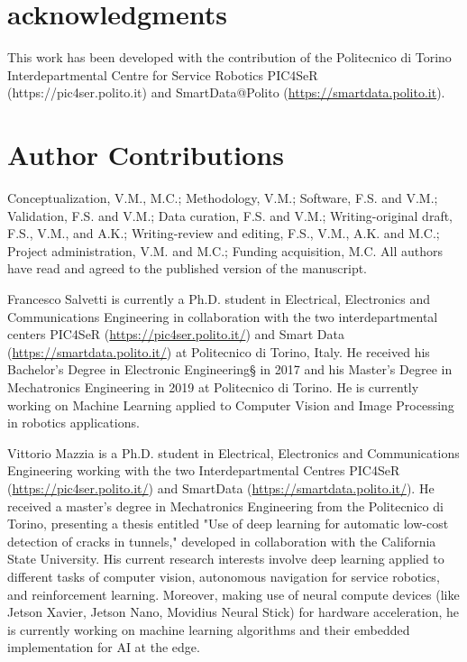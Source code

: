 \documentclass[journal]{IEEEtran}
\begin{document}
\section*{acknowledgments}
This work has been developed with the contribution of the Politecnico di Torino Interdepartmental Centre for Service Robotics PIC4SeR (https://pic4ser.polito.it) and SmartData@Polito (\url{https://smartdata.polito.it}).

\section*{Author Contributions}
Conceptualization, V.M., M.C.; Methodology, V.M.; Software, F.S. and V.M.; Validation, F.S. and V.M.; Data curation, F.S. and V.M.; Writing-original draft, F.S., V.M., and
A.K.; Writing-review and editing, F.S., V.M., A.K. and M.C.; Project administration, V.M. and M.C.; Funding acquisition, M.C. All authors have read and agreed to the published version of the manuscript.










\vfill\break

\begin{IEEEbiography}{Francesco Salvetti} is currently a Ph.D. student in Electrical, Electronics and Communications Engineering in collaboration with the two interdepartmental centers PIC4SeR (\url{https://pic4ser.polito.it/}) and Smart Data (\url{https://smartdata.polito.it/}) at Politecnico di Torino, Italy. He received his Bachelor's Degree in Electronic Engineering§ in 2017 and his Master’s Degree in Mechatronics Engineering in 2019 at Politecnico di Torino. He is currently working on Machine Learning applied to Computer Vision and Image Processing in robotics applications.
\end{IEEEbiography}


\begin{IEEEbiography}{Vittorio Mazzia} is a Ph.D. student in Electrical, Electronics and Communications Engineering working with the two Interdepartmental Centres PIC4SeR (\url{https://pic4ser.polito.it/}) and SmartData (\url{https://smartdata.polito.it/}). He received a master's degree in Mechatronics Engineering from the Politecnico di Torino, presenting a thesis entitled "Use of deep learning for automatic low-cost detection of cracks in tunnels," developed in collaboration with the California State University. His current research interests involve deep learning applied to different tasks of computer vision, autonomous navigation for service robotics, and reinforcement learning. Moreover, making use of neural compute devices (like Jetson Xavier, Jetson Nano, Movidius Neural Stick) for hardware acceleration, he is currently working on machine learning algorithms and their embedded implementation for AI at the edge. 
\end{IEEEbiography}
\end{document}
